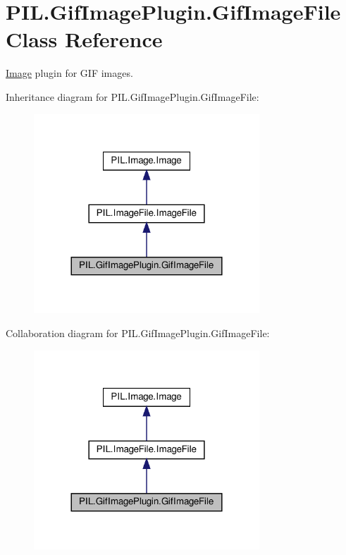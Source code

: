 \hypertarget{classPIL_1_1GifImagePlugin_1_1GifImageFile}{}\section{P\+I\+L.\+Gif\+Image\+Plugin.\+Gif\+Image\+File Class Reference}
\label{classPIL_1_1GifImagePlugin_1_1GifImageFile}


\hyperlink{namespacePIL_1_1Image}{Image} plugin for G\+IF images.  




Inheritance diagram for P\+I\+L.\+Gif\+Image\+Plugin.\+Gif\+Image\+File\+:
\nopagebreak
\begin{figure}[H]
\begin{center}
\leavevmode
\includegraphics[width=240pt]{classPIL_1_1GifImagePlugin_1_1GifImageFile__inherit__graph}
\end{center}
\end{figure}


Collaboration diagram for P\+I\+L.\+Gif\+Image\+Plugin.\+Gif\+Image\+File\+:
\nopagebreak
\begin{figure}[H]
\begin{center}
\leavevmode
\includegraphics[width=240pt]{classPIL_1_1GifImagePlugin_1_1GifImageFile__coll__graph}
\end{center}
\end{figure}

